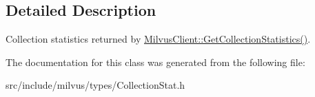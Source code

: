 \subsection{Detailed Description}
Collection statistics returned by \hyperlink{classmilvus_1_1_milvus_client_a0c49e2a5728a70f203118232c16ba47f}{Milvus\+Client\+::\+Get\+Collection\+Statistics()}. 

The documentation for this class was generated from the following file\+:\begin{DoxyCompactItemize}
\item 
src/include/milvus/types/Collection\+Stat.\+h\end{DoxyCompactItemize}
